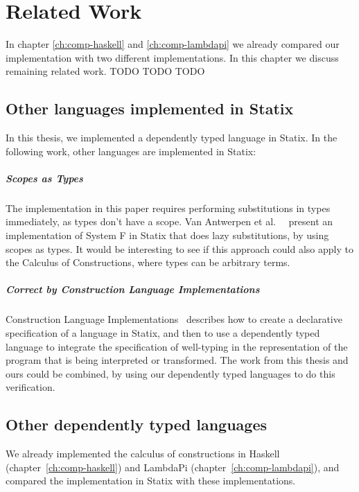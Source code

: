 \chapter{Related Work}
\label{ch:relatedwork}

In chapter \ref{ch:comp-haskell} and \ref{ch:comp-lambdapi} we already compared our implementation with two different implementations. In this chapter we discuss remaining related work.
TODO TODO TODO

\section{Other languages implemented in Statix}

In this thesis, we implemented a dependently typed language in Statix. In the following work, other languages are implemented in Statix:

\paragraph{Scopes as Types}

The implementation in this paper requires performing substitutions in types immediately, as types don't have a scope. Van Antwerpen et al.~\cite[sect 2.5]{scopes_as_types}~\cite{nameres} present an implementation of System F in Statix that does lazy substitutions, by using scopes as types. It would be interesting to see if this approach could also apply to the Calculus of Constructions, where types can be arbitrary terms. 

\paragraph{Correct by Construction Language Implementations}

Construction Language Implementations~\cite{Rouvoet21} describes how to create a declarative specification of a language in Statix, and then to use a dependently typed language to integrate the specification of well-typing in the representation of the program that is being interpreted or transformed. The work from this thesis and ours could be combined, by using our dependently typed languages to do this verification.

\section{Other dependently typed languages}

We already implemented the calculus of constructions in Haskell (chapter~\ref{ch:comp-haskell}) and LambdaPi (chapter~\ref{ch:comp-lambdapi}), and compared the implementation in Statix with these implementations. 


